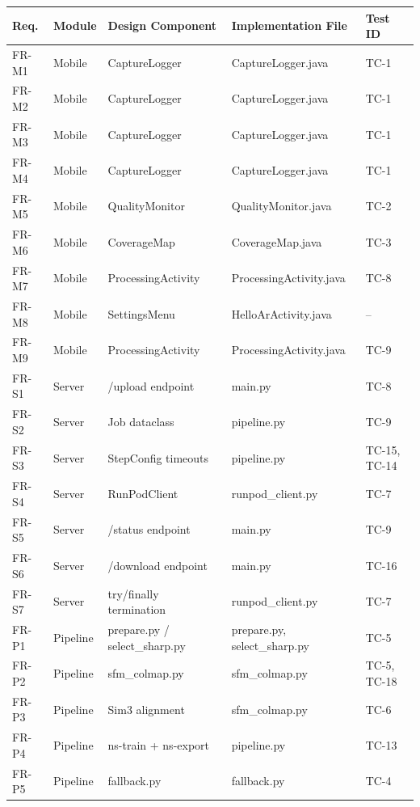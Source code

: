 \begin{longtable}{p{}p{}p{}p{}p{}}
\toprule
\textbf{Req.} & \textbf{Module} & \textbf{Design Component} & \textbf{Implementation File} & \textbf{Test ID} \\
\midrule
FR-M1 & Mobile & CaptureLogger & CaptureLogger.java & TC-1 \\
FR-M2 & Mobile & CaptureLogger & CaptureLogger.java & TC-1 \\
FR-M3 & Mobile & CaptureLogger & CaptureLogger.java & TC-1 \\
FR-M4 & Mobile & CaptureLogger & CaptureLogger.java & TC-1 \\
FR-M5 & Mobile & QualityMonitor & QualityMonitor.java & TC-2 \\
FR-M6 & Mobile & CoverageMap & CoverageMap.java & TC-3 \\
FR-M7 & Mobile & ProcessingActivity & ProcessingActivity.java & TC-8 \\
FR-M8 & Mobile & SettingsMenu & HelloArActivity.java & -- \\
FR-M9 & Mobile & ProcessingActivity & ProcessingActivity.java & TC-9 \\
FR-S1 & Server & /upload endpoint & main.py & TC-8 \\
FR-S2 & Server & Job dataclass & pipeline.py & TC-9 \\
FR-S3 & Server & StepConfig timeouts & pipeline.py & TC-15, TC-14 \\
FR-S4 & Server & RunPodClient & runpod\_client.py & TC-7 \\
FR-S5 & Server & /status endpoint & main.py & TC-9 \\
FR-S6 & Server & /download endpoint & main.py & TC-16 \\
FR-S7 & Server & try/finally termination & runpod\_client.py & TC-7 \\
FR-P1 & Pipeline & prepare.py / select\_sharp.py & prepare.py, select\_sharp.py & TC-5 \\
FR-P2 & Pipeline & sfm\_colmap.py & sfm\_colmap.py & TC-5, TC-18 \\
FR-P3 & Pipeline & Sim3 alignment & sfm\_colmap.py & TC-6 \\
FR-P4 & Pipeline & ns-train + ns-export & pipeline.py & TC-13 \\
FR-P5 & Pipeline & fallback.py & fallback.py & TC-4 \\
\bottomrule
\end{longtable}
